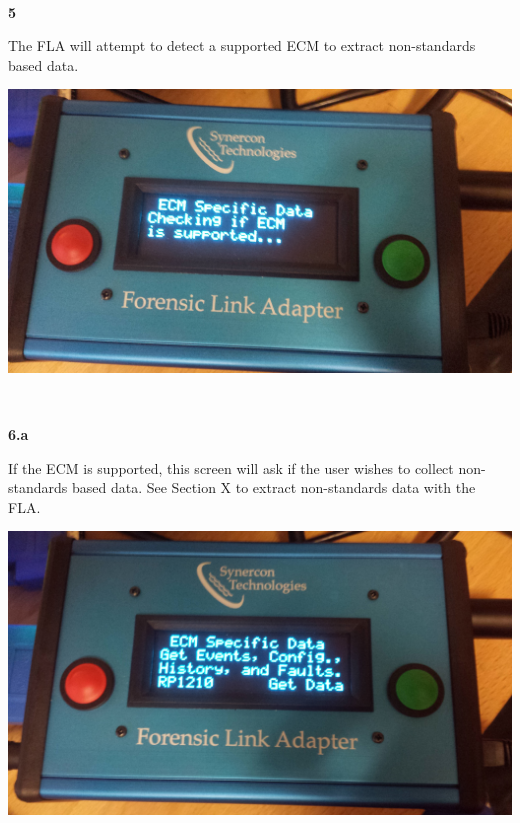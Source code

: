 \documentclass[11pt]{article}
\begin{document}
\\[\baselineskip]
\noindent\begin{minipage}{0.3\textwidth}%
\begin{center}
\textbf{5}\\[\baselineskip]
\end{center}
The FLA will attempt to detect a supported ECM to extract non-standards based data.
\end{minipage}%
\hfill%
\begin{minipage}{0.6\textwidth}
\includegraphics[width=\linewidth]{../media/fla_screens/ecm_check}
\end{minipage}
\\[\baselineskip]
\noindent\begin{minipage}{0.3\textwidth}%
\begin{center}
\textbf{6.a}\\[\baselineskip]
\end{center}
If the ECM is supported, this screen will ask if the user wishes to collect non-standards based data. See Section X to extract non-standards data with the FLA.
\end{minipage}%
\hfill%
\begin{minipage}{0.6\textwidth}
\includegraphics[width=\linewidth]{../media/fla_screens/ecm_confirm}
\end{minipage}
\end{document}

